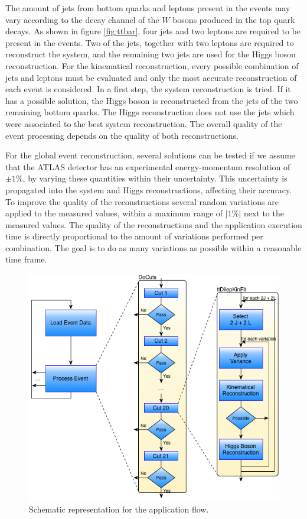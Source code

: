 The amount of jets from bottom quarks and leptons present in the events may vary according to the decay channel of the $W$ bosons produced in the top quark decays. As shown in figure \ref{fig:ttbar}, four jets and two leptons are required to be present in the events. Two of the jets, together with two leptons are required to reconstruct the \ttbar system, and the remaining two jets are used for the Higgs boson reconstruction. For the kinematical reconstruction, every possible combination of jets and leptons must be evaluated and only the most accurate reconstruction of each event is considered. In a first step, the \ttbar system reconstruction is tried.  If it has a possible solution, the Higgs boson is reconstructed from the jets of the two remaining bottom quarks. The Higgs reconstruction does not use the jets which were associated to the best \ttbar system reconstruction. The overall quality of the event processing depends on the quality of both reconstructions.

For the global event reconstruction, several solutions can be tested if we assume that the ATLAS detector has an experimental energy-momentum resolution of $\pm1\%$, by varying these quantities within their uncertainty. This uncertainty is propagated into the \ttbar system and Higgs reconstructions, affecting their accuracy. To improve the quality of the reconstructions several random variations are applied to the measured values, within a maximum range of $|1\%|$ next to the measured values. The quality of the reconstructions and the application execution time is directly proportional to the amount of variations performed per combination. The goal is to do as many variations as possible within a reasonable time frame.

\begin{figure}[!htp]
	\begin{center}
		\includegraphics[scale=0.5]{imgs/graf_abstract_flow_with_kinfit.png}
		\caption{Schematic representation for the \tth application flow.}
		\label{fig:flow}
	\end{center}
\end{figure}

